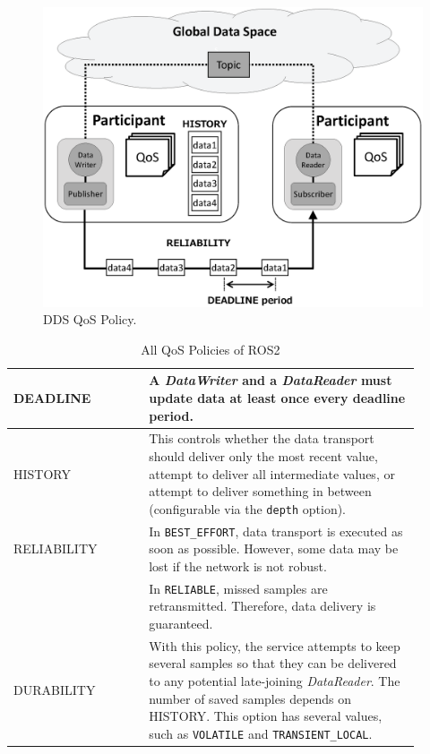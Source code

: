 \documentclass{sig-alternate-05-2015}
\begin{document}
\begin{figure}[t]
\centering
\includegraphics[width=0.8\linewidth]{../figure/DDS_qos.eps}
\caption{\label{fig:orgparagraph4}
DDS QoS Policy.}
\end{figure}

\renewcommand{\arraystretch}{1.0}
\begin{table}[t]
\caption{\label{tab:orgtable1}
  All QoS Policies of ROS2}
\centering
\small
\begin{tabular}{|p{0.3\linewidth}|p{0.6\linewidth}|}
\hline
DEADLINE &  A \emph{DataWriter} and a \emph{DataReader} must update data at least once every deadline period.\\
\hline
HISTORY &  This controls whether the data transport should deliver only the most recent value, attempt to deliver all intermediate values, or attempt to deliver something in between (configurable via the \texttt{depth} option).\\
\hline
RELIABILITY & In \texttt{BEST\_EFFORT}, data transport is executed as soon as possible. However, some data may be lost if the network is not robust. \\
& In \texttt{RELIABLE}, missed samples are retransmitted. Therefore, data delivery is guaranteed.\\
\hline
DURABILITY & With this policy, the service attempts to keep several samples so that they can be delivered to any potential late-joining \emph{DataReader}. The number of saved samples depends on HISTORY. This option has several values, such as \texttt{VOLATILE} and \texttt{TRANSIENT\_LOCAL}.\\
\hline
\end{tabular}
\end{table}
\end{document}
